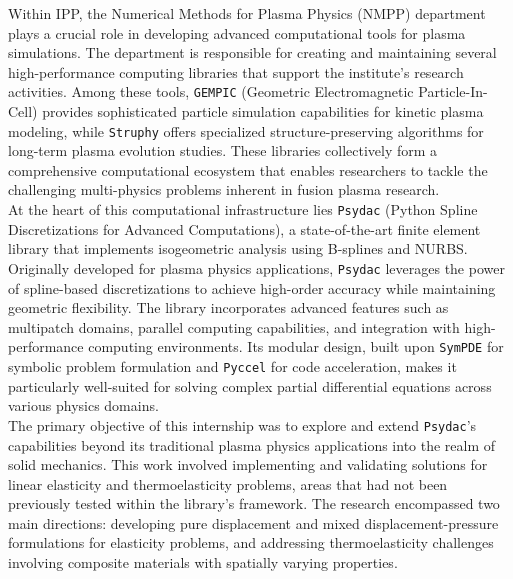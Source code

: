 \documentclass[a4paper,12pt,twoside]{report}
\begin{document}
Within IPP, the Numerical Methods for Plasma Physics (NMPP) department plays a crucial role in developing advanced computational tools for plasma simulations. The department is responsible for creating and maintaining several high-performance computing libraries that support the institute's research activities. Among these tools, \texttt{GEMPIC} (Geometric Electromagnetic Particle-In-Cell) provides sophisticated particle simulation capabilities for kinetic plasma modeling, while \texttt{Struphy} offers specialized structure-preserving algorithms for long-term plasma evolution studies. These libraries collectively form a comprehensive computational ecosystem that enables researchers to tackle the challenging multi-physics problems inherent in fusion plasma research.\\

At the heart of this computational infrastructure lies \texttt{Psydac} (Python Spline Discretizations for Advanced Computations), a state-of-the-art finite element library that implements isogeometric analysis using B-splines and NURBS. Originally developed for plasma physics applications, \texttt{Psydac} leverages the power of spline-based discretizations to achieve high-order accuracy while maintaining geometric flexibility. The library incorporates advanced features such as multipatch domains, parallel computing capabilities, and integration with high-performance computing environments. Its modular design, built upon \texttt{SymPDE} for symbolic problem formulation and \texttt{Pyccel} for code acceleration, makes it particularly well-suited for solving complex partial differential equations across various physics domains.\\

The primary objective of this internship was to explore and extend \texttt{Psydac}'s capabilities beyond its traditional plasma physics applications into the realm of solid mechanics. This work involved implementing and validating solutions for linear elasticity and thermoelasticity problems, areas that had not been previously tested within the library's framework. The research encompassed two main directions: developing pure displacement and mixed displacement-pressure formulations for elasticity problems, and addressing thermoelasticity challenges involving composite materials with spatially varying properties.\\
\end{document}

